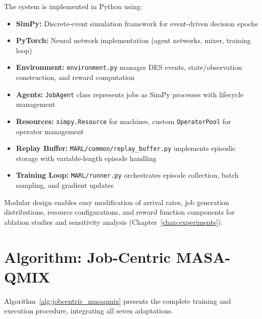 The system is implemented in Python using:
\begin{itemize}
\item \textbf{SimPy:} Discrete-event simulation framework for event-driven decision epochs
\item \textbf{PyTorch:} Neural network implementation (agent networks, mixer, training loop)
\item \textbf{Environment:} \texttt{environment.py} manages DES events, state/observation construction, and reward computation
\item \textbf{Agents:} \texttt{JobAgent} class represents jobs as SimPy processes with lifecycle management
\item \textbf{Resources:} \texttt{simpy.Resource} for machines, custom \texttt{OperatorPool} for operator management
\item \textbf{Replay Buffer:} \texttt{MARL/common/replay\_buffer.py} implements episodic storage with variable-length episode handling
\item \textbf{Training Loop:} \texttt{MARL/runner.py} orchestrates episode collection, batch sampling, and gradient updates
\end{itemize}

Modular design enables easy modification of arrival rates, job generation distributions, resource configurations, and reward function components for ablation studies and sensitivity analysis (Chapter~\ref{chap:experiments}).


\section{Algorithm: Job-Centric MASA-QMIX}
\label{sec:algorithm}

Algorithm~\ref{alg:jobcentric_masaqmix} presents the complete training and execution procedure, integrating all seven adaptations.

